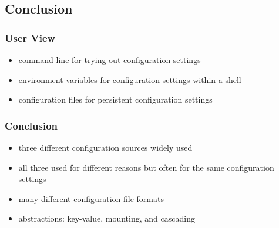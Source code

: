 \subsection{Conclusion}

\begin{frame}
	\frametitle{User View}
	\begin{itemize}
	\item command-line for trying out configuration settings
	\item environment variables for configuration settings within a shell
	\item configuration files for persistent configuration settings
	\end{itemize}
\end{frame}

\begin{frame}
	\frametitle{Conclusion}
	\begin{itemize}
	\item three different configuration sources widely used
	\item all three used for different reasons but often for the same configuration settings
	\item many different configuration file formats
	\item abstractions: key-value, mounting, and cascading
	\end{itemize}
\end{frame}



\nocite{raab2017introducing}

\appendix

\begin{frame}[allowframebreaks]
	
	
\end{frame}




